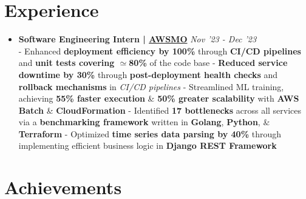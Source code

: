 \documentclass[a4paper,10pt]{extarticle} %
\begin{document}
\section{\textcolor{primary}{Experience}}
\vspace{+0.1cm}

\begin{itemize}[leftmargin=0.55cm, rightmargin=0.2cm, label={\Large\textbullet}]

\item \textbf{Software Engineering Intern | \href{https://awsmo.ai/}{AWSMO}} \hfill{\textit{Nov '23 - Dec '23}} \\
- Enhanced \textbf{deployment efficiency by 100\%} through \textbf{CI/CD pipelines} and \textbf{unit tests covering $\simeq$80\%} of the code base \newline
- \textbf{Reduced service downtime by 30\%} through \textbf{post-deployment health checks} and \textbf{rollback mechanisms} in \textit{CI/CD pipelines} \newline
- Streamlined ML training, achieving \textbf{55\% faster execution} \& \textbf{50\% greater scalability} with \textbf{AWS Batch} \& \textbf{CloudFormation} \newline
- Identified \textbf{17 bottlenecks} across all services via a \textbf{benchmarking framework} written in \textbf{Golang}, \textbf{Python}, \& \textbf{Terraform} \newline
- Optimized \textbf{time series data parsing by 40\%} through implementing efficient business logic in \textbf{Django REST Framework}

\end{itemize}

 \vspace{0.2cm}
\section{\textcolor{primary}{Achievements}}
 \vspace{0.1cm}
\end{document}
